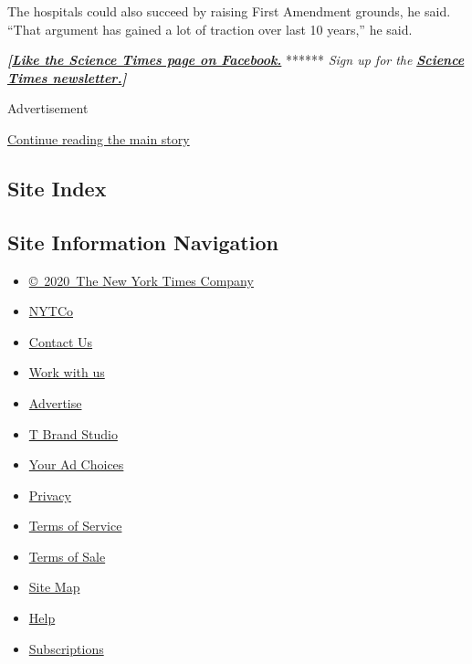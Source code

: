 The hospitals could also succeed by raising First Amendment grounds, he
said. ``That argument has gained a lot of traction over last 10 years,''
he said.

\textbf{\emph{{[}}\href{http://on.fb.me/1paTQ1h}{\emph{Like the Science
Times page on Facebook.}}} ****** \emph{\textbar{} Sign up for the}
\textbf{\href{http://nyti.ms/1MbHaRU}{\emph{Science Times
newsletter.}}\emph{{]}}}

Advertisement

\protect\hyperlink{after-bottom}{Continue reading the main story}

\hypertarget{site-index}{%
\subsection{Site Index}\label{site-index}}

\hypertarget{site-information-navigation}{%
\subsection{Site Information
Navigation}\label{site-information-navigation}}

\begin{itemize}
\tightlist
\item
  \href{https://help.nytimes3xbfgragh.onion/hc/en-us/articles/115014792127-Copyright-notice}{©~2020~The
  New York Times Company}
\end{itemize}

\begin{itemize}
\tightlist
\item
  \href{https://www.nytco.com/}{NYTCo}
\item
  \href{https://help.nytimes3xbfgragh.onion/hc/en-us/articles/115015385887-Contact-Us}{Contact
  Us}
\item
  \href{https://www.nytco.com/careers/}{Work with us}
\item
  \href{https://nytmediakit.com/}{Advertise}
\item
  \href{http://www.tbrandstudio.com/}{T Brand Studio}
\item
  \href{https://www.nytimes3xbfgragh.onion/privacy/cookie-policy\#how-do-i-manage-trackers}{Your
  Ad Choices}
\item
  \href{https://www.nytimes3xbfgragh.onion/privacy}{Privacy}
\item
  \href{https://help.nytimes3xbfgragh.onion/hc/en-us/articles/115014893428-Terms-of-service}{Terms
  of Service}
\item
  \href{https://help.nytimes3xbfgragh.onion/hc/en-us/articles/115014893968-Terms-of-sale}{Terms
  of Sale}
\item
  \href{https://spiderbites.nytimes3xbfgragh.onion}{Site Map}
\item
  \href{https://help.nytimes3xbfgragh.onion/hc/en-us}{Help}
\item
  \href{https://www.nytimes3xbfgragh.onion/subscription?campaignId=37WXW}{Subscriptions}
\end{itemize}
